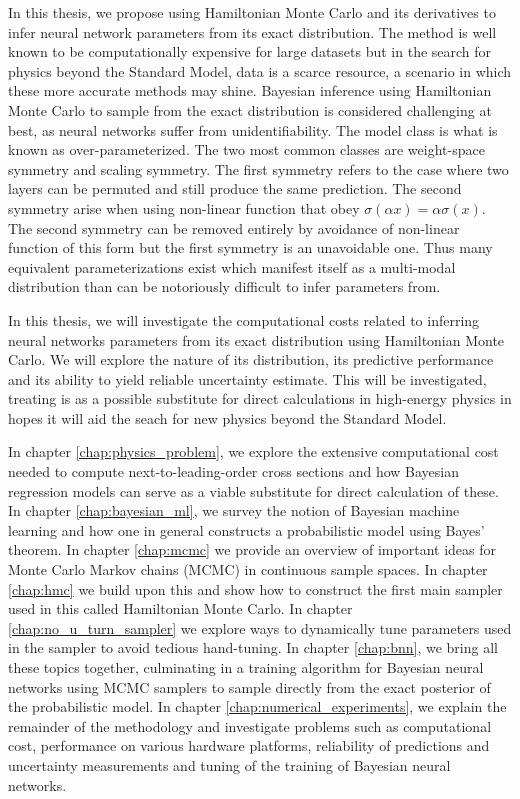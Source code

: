 In this thesis, we propose using Hamiltonian Monte Carlo and its derivatives to infer neural network parameters from its exact distribution. The method is well known to be computationally expensive for large datasets but in the search for physics beyond the Standard Model, data is a scarce resource, a scenario in which these more accurate methods may shine. Bayesian inference using Hamiltonian Monte Carlo to sample from the exact distribution is considered challenging at best, as neural networks suffer from unidentifiability. The model class is what is known as over-parameterized. The two most common classes are weight-space symmetry and scaling symmetry. The first symmetry refers to the case where two layers can be permuted and still produce the same prediction. The second symmetry arise when using non-linear function that obey $\sigma(\alpha x) = \alpha\sigma(x)$. The second symmetry can be removed entirely by avoidance of non-linear function of this form but the first symmetry is an unavoidable one. Thus many equivalent parameterizations exist which manifest itself as a multi-modal distribution than can be notoriously difficult to infer parameters from.

In this thesis, we will investigate the computational costs related to inferring neural networks parameters from its exact distribution using Hamiltonian Monte Carlo. We will explore the nature of its distribution, its predictive performance and its ability to yield reliable uncertainty estimate. This will be investigated, treating is as a possible substitute for direct calculations in high-energy physics in hopes it will aid the seach for new physics beyond the Standard Model.

In chapter \ref{chap:physics_problem}, we explore the extensive computational cost needed to compute next-to-leading-order cross sections and how Bayesian regression models can serve as a viable substitute for direct calculation of these. In chapter \ref{chap:bayesian_ml}, we survey the notion of Bayesian machine learning and how one in general constructs a probabilistic model using Bayes' theorem. In chapter \ref{chap:mcmc} we provide an overview of important ideas for Monte Carlo Markov chains (MCMC) in continuous sample spaces. In chapter \ref{chap:hmc} we build upon this and show how to construct the first main sampler used in this called Hamiltonian Monte Carlo. In chapter \ref{chap:no_u_turn_sampler} we explore ways to dynamically tune parameters used in the sampler to avoid tedious hand-tuning. In chapter \ref{chap:bnn}, we bring all these topics together, culminating in a training algorithm for Bayesian neural networks using MCMC samplers to sample directly from the exact posterior of the probabilistic model. In chapter \ref{chap:numerical_experiments}, we explain the remainder of the methodology and investigate problems such as computational cost, performance on various hardware platforms, reliability of predictions and uncertainty measurements and tuning of the training of Bayesian neural networks.
